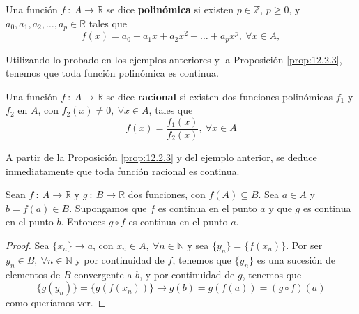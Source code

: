\begin{definicion}
    Una función $f ~:~ A \longrightarrow \mathbb{R}$ se dice \textbf{polinómica} si existen $p \in \mathbb{Z}$, $p \geq 0$, y
    $a_0, a_1, a_2, \dots, a_p \in \mathbb{R}$ tales que
    \begin{equation*}
        f(x) = a_0+a_1x+a_2x^2+\dots+a_px^p, ~ \forall x \in A,
    \end{equation*}
\end{definicion}

Utilizando lo probado en los ejemplos anteriores y la Proposición \ref{prop:12.2.3}, tenemos que toda función polinómica es continua.

\begin{definicion}
    Una función $f ~:~ A \longrightarrow \mathbb{R}$ se dice \textbf{racional} si existen dos funciones polinómicas $f_1$ y $f_2$ en $A$,
    con $f_2(x) \neq 0, ~ \forall x \in A$, tales que
    \begin{equation*}
        f(x) = \frac{f_1(x)}{f_2(x)}, ~ \forall x \in A
    \end{equation*}
\end{definicion}
A partir de la Proposición \ref{prop:12.2.3} y del ejemplo anterior, se deduce inmediatamente que toda función racional es continua.

\begin{prop}
    Sean $f ~:~ A \longrightarrow \mathbb{R}$ y $g ~:~ B \longrightarrow \mathbb{R}$ dos funciones, con $f(A) \subseteq B$.
    Sea $a \in A$ y $b = f(a) \in B$. Supongamos que $f$ es continua en el punto $a$ y que $g$ es continua en el punto $b$.
    Entonces $g \circ f$ es continua en el punto $a$.
\end{prop}
\begin{proof}
    Sea $\{x_n\} \longrightarrow a$, con $x_n \in A, ~ \forall n \in \mathbb{N}$ y sea $\{y_n\} = \{f(x_n)\}$.
    Por ser $y_n \in B, ~ \forall n \in \mathbb{N}$ y por continuidad de $f$, tenemos que $\{y_n\}$ es una
    sucesión de elementos de $B$ convergente a $b$, y por continuidad de $g$, tenemos que
    \begin{equation*}
        \{g(y_n)\} = \{g(f(x_n))\} \longrightarrow g(b) = g(f(a)) = (g \circ f)(a)
    \end{equation*}
    como queríamos ver.
\end{proof}



